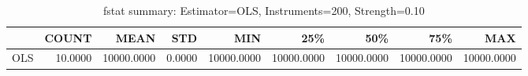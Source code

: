 \begin{table}[ht]
\centering
\caption{fstat summary: Estimator=OLS, Instruments=200, Strength=0.10}
\begin{tabular}{lrrrrrrrr}
\toprule
 & COUNT & MEAN & STD & MIN & 25\% & 50\% & 75\% & MAX \\
\midrule
OLS & 10.0000 & 10000.0000 & 0.0000 & 10000.0000 & 10000.0000 & 10000.0000 & 10000.0000 & 10000.0000 \\
\bottomrule
\end{tabular}
\end{table}
